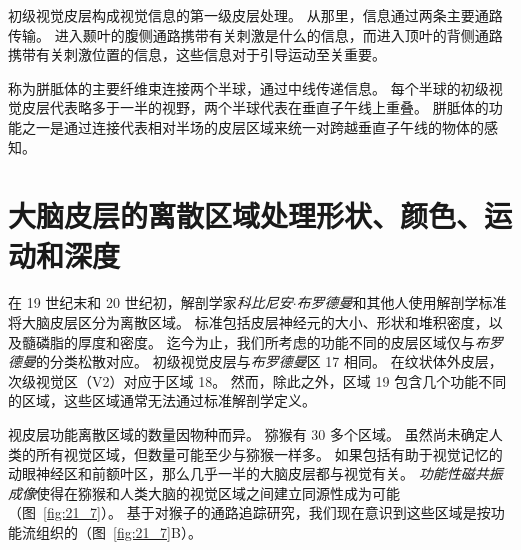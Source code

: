 初级视觉皮层构成视觉信息的第一级皮层处理。
从那里，信息通过两条主要通路传输。
进入颞叶的腹侧通路携带有关刺激是什么的信息，而进入顶叶的背侧通路携带有关刺激位置的信息，这些信息对于引导运动至关重要。


称为胼胝体的主要纤维束连接两个半球，通过中线传递信息。
每个半球的初级视觉皮层代表略多于一半的视野，两个半球代表在垂直子午线上重叠。
胼胝体的功能之一是通过连接代表相对半场的皮层区域来统一对跨越垂直子午线的物体的感知。



\section{大脑皮层的离散区域处理形状、颜色、运动和深度}

在 19 世纪末和 20 世纪初，解剖学家\textit{科比尼安$\cdot$布罗德曼}和其他人使用解剖学标准将大脑皮层区分为离散区域。
标准包括皮层神经元的大小、形状和堆积密度，以及髓磷脂的厚度和密度。
迄今为止，我们所考虑的功能不同的皮层区域仅与\textit{布罗德曼}的分类松散对应。
初级视觉皮层与\textit{布罗德曼}区 17 相同。
在纹状体外皮层，次级视觉区（V2）对应于区域 18。
然而，除此之外，区域 19 包含几个功能不同的区域，这些区域通常无法通过标准解剖学定义。


视皮层功能离散区域的数量因物种而异。
猕猴有 30 多个区域。
虽然尚未确定人类的所有视觉区域，但数量可能至少与猕猴一样多。
如果包括有助于视觉记忆的动眼神经区和前额叶区，那么几乎一半的大脑皮层都与视觉有关。
\textit{功能性磁共振成像}使得在猕猴和人类大脑的视觉区域之间建立同源性成为可能（图~\ref{fig:21_7}）。
基于对猴子的通路追踪研究，我们现在意识到这些区域是按功能流组织的（图~\ref{fig:21_7}B）。


